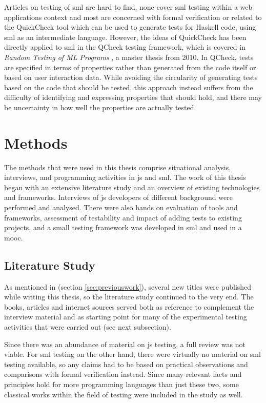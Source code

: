 \documentclass[11pt]{article}
\begin{document}
Articles on testing of \gls{sml} are hard to find, none cover \gls{sml} testing within a web applications context and most are concerned with formal verification or related to the QuickCheck tool which can be used to generate tests for Haskell code, using \gls{sml} as an intermediate language. However, the ideas of QuickCheck has been directly applied to \gls{sml} in the QCheck testing framework, which is covered in \emph{Random Testing of ML Programs} \cite{RandomML}, a master thesis from 2010. In QCheck, tests are specified in terms of properties rather than generated from the code itself or based on user interaction data. While avoiding the circularity of generating tests based on the code that should be tested, this approach instead suffers from the difficulty of identifying and expressing properties that should hold, and there may be uncertainty in how well the properties are actually tested.


\section{Methods}
\label{sec:methods}

The methods that were used in this thesis comprise situational analysis, interviews, and programming activities in \gls{js} and \gls{sml}. The work of this thesis began with an extensive literature study and an overview of existing technologies and frameworks. Interviews of \gls{js} developers of different background were performed and analysed. There were also hands on evaluation of tools and frameworks, assessment of testability and impact of adding tests to existing projects, and a small testing framework was developed in \gls{sml} and used in a \gls{mooc}.

\subsection{Literature Study}

As mentioned in  (section \ref{sec:previouswork}), several new titles were published while writing this thesis, so the literature study continued to the very end. The books, articles and internet sources served both as reference to complement the interview material and as starting point for many of the experimental testing activities that were carried out (see next subsection).

Since there was an abundance of material on \gls{js} testing, a full review was not viable. For \gls{sml} testing on the other hand, there were virtually no material on \gls{sml} testing available, so any claims had to be based on practical observations and comparisons with formal verification instead. Since many relevant facts and principles hold for more programming languages than just these two, some classical works within the field of testing were included in the study as well.
\end{document}

